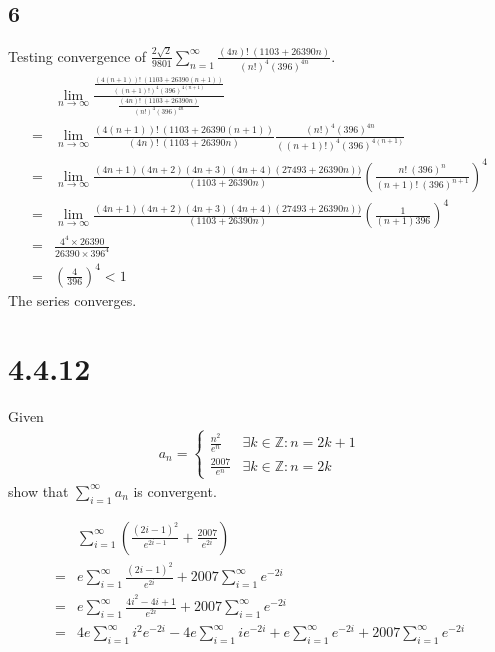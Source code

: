 \documentclass[12pt]{article}
\newcommand{\round}[1]{\left(       #1 \right)      }
\newcommand{\Z}    [0]{\mathbb{Z}                   }
\begin{document}
\subsection*{6}
Testing convergence of $\frac{2\sqrt{2}}{9801} \sum_{n=1}^\infty \frac{(4n)!\ (1103+26390n)}{(n!)^4 (396)^{4n}}$.
\begin{align*}
     & \lim_{n\to\infty} \frac{\frac{(4(n+1))!\ (1103+26390(n+1))}{((n+1)!)^4 (396)^{4(n+1)}}} {\frac{(4n)!\ (1103+26390n)}{(n!)^4 (396)^{4n}}} \\
    =& \lim_{n\to\infty} \frac{(4(n+1))!\ (1103+26390(n+1))}{(4n)!\ (1103+26390n)} \frac{(n!)^4 (396)^{4n}}{((n+1)!)^4 (396)^{4(n+1)}} \\
    =& \lim_{n\to\infty} \frac{(4n+1)(4n+2)(4n+3)(4n+4) (27493+26390n))}{(1103+26390n)} \round{\frac{n!\ (396)^n}{(n+1)!\ (396)^{n+1}}}^4 \\
    =& \lim_{n\to\infty} \frac{(4n+1)(4n+2)(4n+3)(4n+4) (27493+26390n))}{(1103+26390n)} \round{\frac{1}{(n+1) 396}}^4 \\
    =& \frac{4^4 \times 26390}{26390 \times 396^4} \\
    =& \round{\frac{4}{396}}^4 < 1
\end{align*}
The series converges.



\section*{4.4.12}
Given
\begin{align*}
    a_n = \begin{cases}
        \frac{n^2}{e^n} & \exists k \in \Z : n = 2k+1 \\
        \frac{2007}{e^n} & \exists k \in \Z : n = 2k
    \end{cases}
\end{align*}
show that $\sum_{i=1}^\infty a_n$ is convergent.

\begin{align*}
     & \sum_{i=1}^\infty \round{\frac{(2i-1)^2}{e^{2i-1}} + \frac{2007}{e^{2i}}} \\
    =& e \sum_{i=1}^\infty \frac{(2i-1)^2}{e^{2i}} + 2007 \sum_{i=1}^\infty e^{-2i} \\
    =& e \sum_{i=1}^\infty \frac{4i^2 - 4i + 1}{e^{2i}} + 2007 \sum_{i=1}^\infty e^{-2i} \\
    =& 4e \sum_{i=1}^\infty i^2 e^{-2i} - 4e \sum_{i=1}^\infty ie^{-2i} + e \sum_{i=1}^\infty e^{-2i} + 2007 \sum_{i=1}^\infty e^{-2i} \\
\end{align*}
\end{document}
